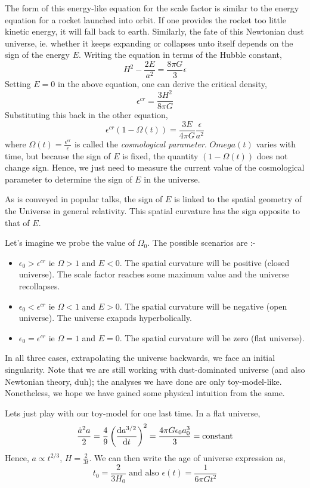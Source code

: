 \documentclass[a4paper,11pt]{report}
\begin{document}
The form of this energy-like equation for the scale factor is similar to the energy equation for a rocket launched into orbit. If one provides the rocket too little kinetic energy, it will fall back to earth. Similarly, the fate of this Newtonian dust universe, ie. whether it keeps expanding or collapses unto itself depends on the sign of the energy $E$. Writing the equation in terms of the Hubble constant,
$$H^2 - \frac{2E}{a^2} = \frac{8 \pi G}{3}\epsilon$$
Setting $E=0$ in the above equation, one can derive the critical density,
$$\epsilon^{cr} = \frac{3H^2}{8\pi G}$$ Substituting this back in the other equation,
$$\epsilon^{cr}(1 - \Omega(t))= \frac{3E}{4 \pi G} \frac{\epsilon}{a^2}$$
where $\Omega(t) = \frac{\epsilon^{cr}}{\epsilon}$ is called the \textit{cosmological parameter}. $Omega(t)$ varies with time, but because the sign of $E$ is fixed, the quantity $(1-\Omega(t))$ does not change sign. Hence, we just need to measure the current value of the cosmological parameter to determine the sign of $E$ in the universe.

As is conveyed in popular talks, the sign of $E$ is linked to the spatial geometry of the Universe in general relativity. This spatial curvature has the sign opposite to that of $E$.

 Let's imagine we probe the value of $\Omega_0$. The possible scenarios are :-
\begin{itemize}
	\item $\epsilon_0 > \epsilon^{cr}$ ie $\Omega > 1$ and $E < 0$. The spatial curvature will be positive (closed universe). The scale factor reaches some maximum value and the universe recollapses.
	\item $\epsilon_0 < \epsilon^{cr}$ ie $\Omega < 1$ and $E > 0$. The spatial curvature will be negative (open universe). The universe exapnds hyperbolically.
	\item $\epsilon_0 = \epsilon^{cr}$ ie $\Omega = 1$ and $E = 0$. The spatial curvature will be zero (flat universe).
\end{itemize}

In all three cases, extrapolating the universe backwards, we face an initial singularity. Note that we are still working with dust-dominated universe (and also Newtonian theory, duh); the analyses we have done are only toy-model-like. Nonetheless, we hope we have gained some physical intuition from the same.

Lets just play with our toy-model for one last time. In a flat universe,
$$\frac{\dot{a}^2a}{2} = \frac{4}{9} \left(\derivative{a^{3/2}}{t} \right)^2 = \frac{4 \pi G \epsilon_0 a_0^3}{3} = \text{constant} $$
Hence, $a \propto t^{2/3}$, $H = \frac{2}{3t}$. We can then write the age of universe expression as,
$$t_0 = \frac{2}{3H_0} \text{ and also } \epsilon(t) = \frac{1}{6 \pi G t^2}$$
\end{document}

